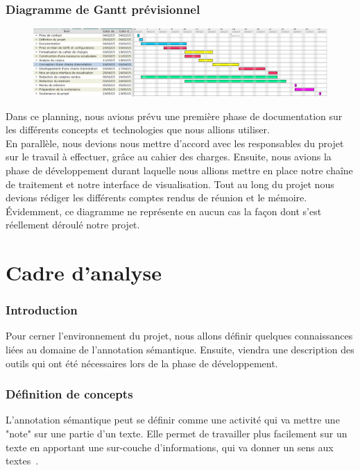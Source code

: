 \documentclass[a4paper, 11pt]{report}
\begin{document}
    \section{Diagramme de Gantt prévisionnel}
    \begin{figure}[H]
    \includegraphics[scale=.3]{img/ganttPrev.png}
    \end{figure}
    Dans ce planning, nous avions prévu une première phase de documentation sur les différents concepts et technologies que nous allions utiliser. \\
En parallèle, nous devions nous mettre d’accord avec les responsables du projet sur le travail à effectuer, grâce au cahier des charges.
Ensuite, nous avions la phase de développement durant laquelle nous allions mettre en place notre chaîne de traitement et notre interface de visualisation. Tout au long du projet nous devions rédiger les différents comptes rendus de réunion et le mémoire.\\
Évidemment, ce diagramme ne représente en aucun cas la façon dont s’est réellement déroulé notre projet.
\part{Cadre d'analyse}
\section*{Introduction}
Pour cerner l'environnement du projet, nous allons définir quelques connaissances liées au domaine de l'annotation sémantique. Ensuite, viendra une description des outils qui ont été nécessaires lors de la phase de développement.\\

\section{Définition de concepts}
L'annotation sémantique peut se définir comme une activité qui va mettre une "note" sur une partie d'un texte. Elle permet de travailler plus facilement sur un texte en apportant une sur-couche d'informations, qui va donner un sens aux textes~\cite{GLNS09}.
\end{document}
